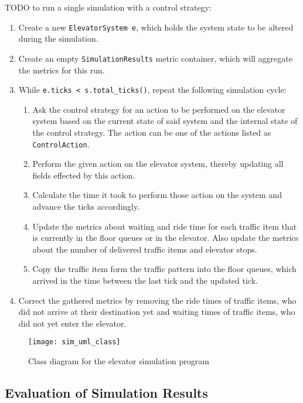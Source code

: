 TODO
to run a single simulation with a control strategy:

\begin{enumerate}
    \item Create a new \texttt{ElevatorSystem e}, which holds the system state to be altered during the simulation.
    \item Create an empty \texttt{SimulationResults} metric container, which will aggregate the metrics for this run.
    \item While \texttt{e.ticks < s.total\_ticks()}, repeat the following simulation cycle:
    \begin{enumerate}
        \item Ask the control strategy for an action to be performed on the elevator system based on the current state of said system and the internal state of the control strategy.
        The action can be one of the actions listed as \texttt{ControlAction}.
        \item Perform the given action on the elevator system, thereby updating all fields effected by this action.
        \item Calculate the time it took to perform those action on the system and advance the ticks accordingly.
        \item Update the  metrics about waiting and ride time for each traffic item that is currently in the floor queues or in the elevator. Also update the metrics about the number of delivered traffic items and elevator stops.
        \item Copy the traffic item form the traffic pattern into the floor queues, which arrived in the time between the last tick and the updated tick.
    \end{enumerate}
    \item Correct the gathered metrics by removing the ride times of traffic items, who did not arrive at their destination yet and waiting times of traffic items, who did not yet enter the elevator.
\end{enumerate}

\begin{figure}[p]
    \centering
    \texttt{[image: sim\_uml\_class]}
    \caption{Class diagram for the elevator simulation program}
    \label{fig:impl:class}
\end{figure}



\subsection{Evaluation of Simulation Results}

